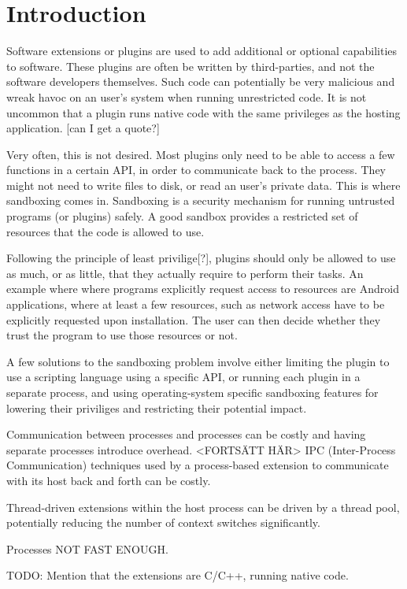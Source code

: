 \chapter {Introduction}

Software extensions or plugins are used to add additional or optional
capabilities to software. These plugins are often be written by third-parties,
and not the software developers themselves. Such code can potentially be very
malicious and wreak havoc on an user's system when running unrestricted code. It
is not uncommon that a plugin runs native code with the same privileges as the
hosting application. [can I get a quote?]

Very often, this is not desired. Most plugins only need to be able to access
a few functions in a certain API, in order to communicate back to the process.
They might not need to write files to disk, or read an user's private data. This
is where sandboxing comes in. Sandboxing is a security mechanism for running
untrusted programs (or plugins) safely. A good sandbox provides a restricted set
of resources that the code is allowed to use.

Following the principle of least privilige[?], plugins should only be allowed to
use as much, or as little, that they actually require to perform their tasks.
An example where where programs explicitly request access to resources are
Android applications, where at least a few resources, such as network access
have to be explicitly requested upon installation. The user can then decide
whether they trust the program to use those resources or not.

A few solutions to the sandboxing problem involve either limiting the plugin to
use a scripting language using a specific API, or running each plugin in a
separate process, and using operating-system specific sandboxing features for
lowering their priviliges and restricting their potential impact.

Communication between processes and processes can be costly and having separate
processes introduce overhead.
<FORTSÄTT HÄR>
IPC (Inter-Process Communication) techniques used by a process-based extension
to communicate with its host back and forth can be costly.

Thread-driven extensions within the host process can be driven by a thread
pool, potentially reducing the number of context switches significantly.

Processes NOT FAST ENOUGH.

TODO: Mention that the extensions are C/C++, running native code.

